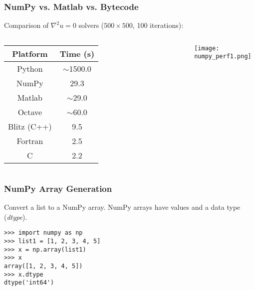 \begin{frame}[fragile]\frametitle{NumPy vs. Matlab vs. Bytecode}

    Comparison of $\nabla^2 u = 0$ solvers ($500\times500$, 100 iterations):
    
    \begin{columns}
        \begin{table}
            \begin{tabular}{|c|c|}
                \hline
                Platform & Time (s) \\
                \hline \hline
                Python & $\sim$1500.0 \\
                \hline
                NumPy & 29.3 \\
                \hline
                Matlab & $\sim$29.0 \\
                \hline
                Octave & $\sim$60.0 \\
                \hline
                Blitz (C++) & 9.5 \\
                \hline
                Fortran & 2.5 \\
                \hline
                C & 2.2 \\
                \hline
            \end{tabular}
        \end{table}
        \begin{center}
            \texttt{[image: numpy\_perf1.png]}
        \end{center}
    \end{columns}

%
\end{frame}

\begin{frame}[fragile]\frametitle{NumPy Array Generation}

    Convert a list to a NumPy array.     NumPy arrays have values and a data type (\textit{dtype}).

    \begin{lstlisting}
>>> import numpy as np
>>> list1 = [1, 2, 3, 4, 5]
>>> x = np.array(list1)
>>> x
array([1, 2, 3, 4, 5])
>>> x.dtype
dtype('int64')
    \end{lstlisting}
\end{frame}

